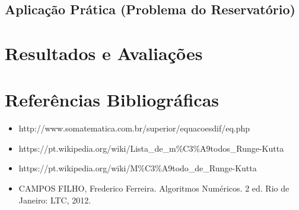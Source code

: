 \documentclass{article}
\begin{document}
	\subsection{Aplica\c c\~ao Pr\'atica (Problema do Reservat\'orio) }
\newpage
\section{Resultados e Avalia\c c\~oes}
\newpage
\section{Refer\^encias Bibliogr\'aficas}
\begin{itemize}
\item
http://www.somatematica.com.br/superior/equacoesdif/eq.php
\item
https://pt.wikipedia.org/wiki/Lista\_de\_m\%C3\%A9todos\_Runge-Kutta
\item
https://pt.wikipedia.org/wiki/M\%C3\%A9todo\_de\_Runge-Kutta
\item 
CAMPOS FILHO, Frederico Ferreira. Algoritmos Num\'ericos. 2 ed. Rio de Janeiro: LTC, 2012.
\end{itemize}
\newpage
\end{document}
